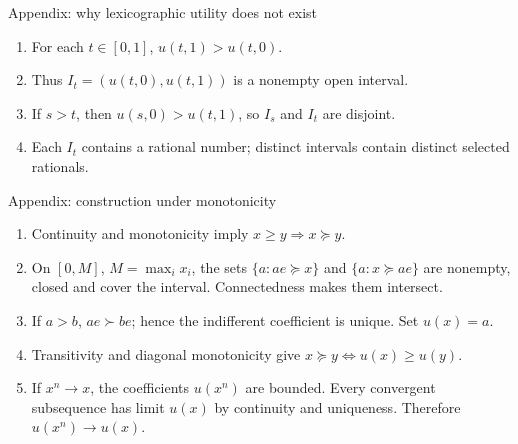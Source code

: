 \documentclass[handout,aspectratio=169,10pt]{beamer}
\begin{document}
\begin{frame}[label=proof-lexicographic]{Appendix: why lexicographic utility does not exist}

\begin{enumerate}
\item For each $t\in[0,1]$, $u(t,1)>u(t,0)$.
\item Thus $I_t=(u(t,0),u(t,1))$ is a nonempty open interval.
\item If $s>t$, then $u(s,0)>u(t,1)$, so $I_s$ and $I_t$ are disjoint.
\item Each $I_t$ contains a rational number; distinct intervals contain distinct selected rationals.
\end{enumerate}

\vfill{}
\end{frame}

\begin{frame}[label=proof-continuity]{Appendix: construction under monotonicity}
\small
{}

\begin{enumerate}
\item Continuity and monotonicity imply $x\ge y\Rightarrow x\succeq y$.
\item On $[0,M]$, $M=\max_i x_i$, the sets $\{a:ae\succeq x\}$ and $\{a:x\succeq ae\}$ are nonempty, closed and cover the interval. Connectedness makes them intersect.
\item If $a>b$, $ae\succ be$; hence the indifferent coefficient is unique. Set $u(x)=a$.
\item Transitivity and diagonal monotonicity give $x\succeq y\iff u(x)\ge u(y)$.
\item If $x^n\to x$, the coefficients $u(x^n)$ are bounded. Every convergent subsequence has limit $u(x)$ by continuity and uniqueness. Therefore $u(x^n)\to u(x)$.
\end{enumerate}
\vfill{}
\end{frame}
\end{document}
